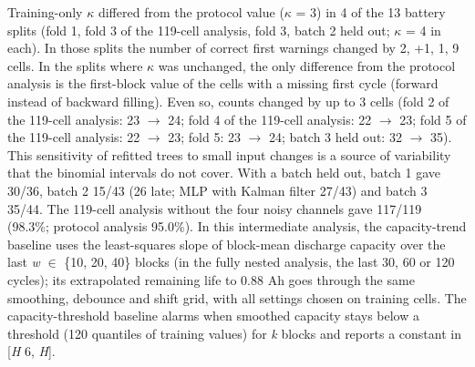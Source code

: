 \documentclass[11pt,a4paper]{article}
\begin{document}
\noindent Training-only $\kappa$ differed from the protocol value ($\kappa$ = 3) in 4 of the 13 battery splits (fold 1, fold 3 of the 119-cell analysis, fold 3, batch 2 held out; $\kappa$ = 4 in each). In those splits the number of correct first warnings changed by \textminus{}2, +1, \textminus{}1, \textminus{}9 cells. In the splits where $\kappa$ was unchanged, the only difference from the protocol analysis is the first-block value of the cells with a missing first cycle (forward instead of backward filling). Even so, counts changed by up to 3 cells (fold 2 of the 119-cell analysis: 23 $\rightarrow$ 24; fold 4 of the 119-cell analysis: 22 $\rightarrow$ 23; fold 5 of the 119-cell analysis: 22 $\rightarrow$ 23; fold 5: 23 $\rightarrow$ 24; batch 3 held out: 32 $\rightarrow$ 35). This sensitivity of refitted trees to small input changes is a source of variability that the binomial intervals do not cover. With a batch held out, batch 1 gave 30/36, batch 2 15/43 (26 late; MLP with Kalman filter 27/43) and batch 3 35/44. The 119-cell analysis without the four noisy channels gave 117/119 (98.3\%; protocol analysis 95.0\%). In this intermediate analysis, the capacity-trend baseline uses the least-squares slope of block-mean discharge capacity over the last \textit{w} $\in$ \{10, 20, 40\} blocks (in the fully nested analysis, the last 30, 60 or 120 cycles); its extrapolated remaining life to 0.88 Ah goes through the same smoothing, debounce and shift grid, with all settings chosen on training cells. The capacity-threshold baseline alarms when smoothed capacity stays below a threshold (120 quantiles of training values) for \textit{k} blocks and reports a constant in [\textit{H} \textminus{} 6, \textit{H}].
\end{document}
